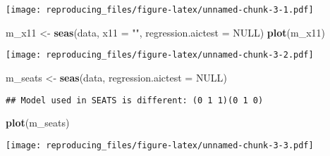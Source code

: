 \documentclass[]{article}
\newenvironment{Shaded}{\begin{snugshade}}{\end{snugshade}}
\newcommand{\DataTypeTok}[1]{\textcolor[rgb]{0.13,0.29,0.53}{#1}}
\newcommand{\KeywordTok}[1]{\textcolor[rgb]{0.13,0.29,0.53}{\textbf{#1}}}
\newcommand{\NormalTok}[1]{#1}
\newcommand{\OtherTok}[1]{\textcolor[rgb]{0.56,0.35,0.01}{#1}}
\newcommand{\StringTok}[1]{\textcolor[rgb]{0.31,0.60,0.02}{#1}}
\begin{document}
\texttt{[image: reproducing\_files/figure-latex/unnamed-chunk-3-1.pdf]}

\begin{Shaded}
\begin{Highlighting}[]
\NormalTok{m_x11 <-}\StringTok{ }\KeywordTok{seas}\NormalTok{(data, }\DataTypeTok{x11 =} \StringTok{""}\NormalTok{, }\DataTypeTok{regression.aictest =}  \OtherTok{NULL}\NormalTok{)}
\KeywordTok{plot}\NormalTok{(m_x11)}
\end{Highlighting}
\end{Shaded}

\texttt{[image: reproducing\_files/figure-latex/unnamed-chunk-3-2.pdf]}

\begin{Shaded}
\begin{Highlighting}[]
\NormalTok{m_seats <-}\StringTok{ }\KeywordTok{seas}\NormalTok{(data, }\DataTypeTok{regression.aictest =} \OtherTok{NULL}\NormalTok{)}
\end{Highlighting}
\end{Shaded}

\begin{verbatim}
## Model used in SEATS is different: (0 1 1)(0 1 0)
\end{verbatim}

\begin{Shaded}
\begin{Highlighting}[]
\KeywordTok{plot}\NormalTok{(m_seats)}
\end{Highlighting}
\end{Shaded}

\texttt{[image: reproducing\_files/figure-latex/unnamed-chunk-3-3.pdf]}
\end{document}

